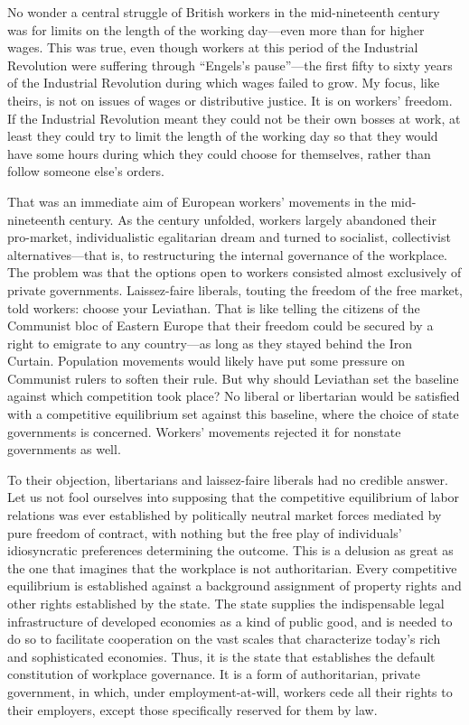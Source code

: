 \documentclass[
  letterpaper,
  11pt,
  DIV=9,
  openright]{scrbook}
\begin{document}
No wonder a central struggle of British workers in the mid-nineteenth
century was for limits on the length of the working day---even more than
for higher wages. This was true, even though workers at this period of
the Industrial Revolution were suffering through ``Engels's
pause''---the first fifty to sixty years of the Industrial Revolution
during which wages failed to grow. My focus, like theirs, is not on
issues of wages or distributive justice. It is on workers' freedom. If
the Industrial Revolution meant they could not be their own bosses at
work, at least they could try to limit the length of the working day so
that they would have some hours during which they could choose for
themselves, rather than follow someone else's orders.

That was an immediate aim of European workers' movements in the
mid-nineteenth century. As the century unfolded, workers largely
abandoned their pro-market, individualistic egalitarian dream and turned
to socialist, collectivist alternatives---that is, to restructuring the
internal governance of the workplace. The problem was that the options
open to workers consisted almost exclusively of private governments.
Laissez-faire liberals, touting the freedom of the free market, told
workers: choose your Leviathan. That is like telling the citizens of the
Communist bloc of Eastern Europe that their freedom could be secured by
a right to emigrate to any country---as long as they stayed behind the
Iron Curtain. Population movements would likely have put some pressure
on Communist rulers to soften their rule. But why should Leviathan set
the baseline against which competition took place? No liberal or
libertarian would be satisfied with a competitive equilibrium set
against this baseline, where the choice of state governments is
concerned. Workers' movements rejected it for nonstate governments as
well.

To their objection, libertarians and laissez-faire liberals had no
credible answer. Let us not fool ourselves into supposing that the
competitive equilibrium of labor relations was ever established by
politically neutral market forces mediated by pure freedom of contract,
with nothing but the free play of individuals' idiosyncratic preferences
determining the outcome. This is a delusion as great as the one that
imagines that the workplace is not authoritarian. Every competitive
equilibrium is established against a background assignment of property
rights and other rights established by the state. The state supplies the
indispensable legal infrastructure of developed economies as a kind of
public good, and is needed to do so to facilitate cooperation on the
vast scales that characterize today's rich and sophisticated economies.
Thus, it is the state that establishes the default constitution of
workplace governance. It is a form of authoritarian, private government,
in which, under employment-at-will, workers cede all their rights to
their employers, except those specifically reserved for them by law.
\end{document}
